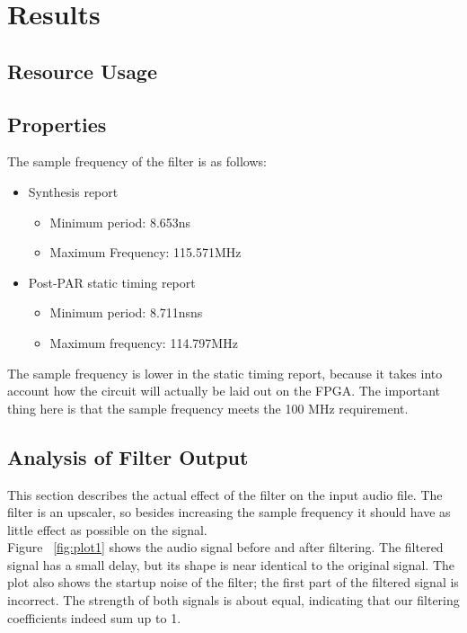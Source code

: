 \section{Results}
\subsection{Resource Usage}
\subsection{Properties}
The sample frequency of the filter is as follows:
\begin{itemize}
\item
Synthesis report
\begin{itemize}
\item Minimum period: 8.653ns
\item Maximum Frequency: 115.571MHz
\end{itemize}
\item
Post-PAR static timing report
\begin{itemize}
\item  Minimum period:   8.711nsns  
\item Maximum frequency: 114.797MHz
\end{itemize}
\end{itemize}
The sample frequency is lower in the static timing report, because it takes into account how the circuit will actually be laid out on the FPGA. The important thing here is that the sample frequency meets the 100 MHz requirement.
\subsection{Analysis of Filter Output }
This section describes the actual effect of the filter on the input audio file. The filter is an upscaler, so besides increasing the sample frequency it should have as little effect as possible on the signal.\\

Figure ~\ref{fig:plot1} shows the audio signal before and after filtering. The filtered signal has a small delay, but its shape is near identical to the original signal. The plot also shows the startup noise of the filter; the first part of the filtered signal is  incorrect. The strength of both signals is about equal, indicating that our filtering coefficients indeed sum up to 1. \\

